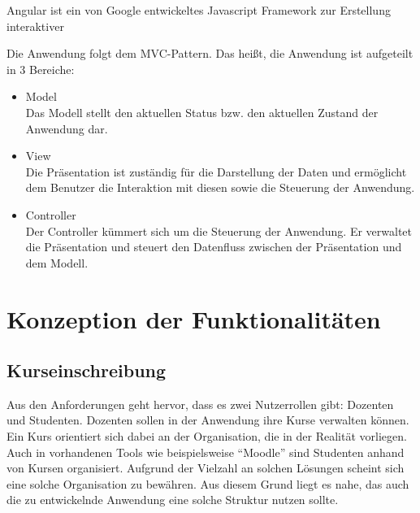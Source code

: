 Angular ist ein von Google entwickeltes Javascript Framework zur Erstellung interaktiver 



Die Anwendung folgt dem \ac{MVC}-Pattern. Das heißt, die Anwendung ist aufgeteilt in 3 Bereiche:
\begin{itemize}%
    \item Model\\
        Das Modell stellt den aktuellen Status bzw. den aktuellen Zustand der Anwendung dar.
    \item View\\
        Die Präsentation ist zuständig für die Darstellung der Daten und ermöglicht dem Benutzer die Interaktion mit diesen sowie die Steuerung der Anwendung.
    \item Controller\\
        Der Controller kümmert sich um die Steuerung der Anwendung. Er verwaltet die Präsentation und steuert den Datenfluss zwischen der Präsentation und dem Modell.
\end{itemize}


\section{Konzeption der Funktionalitäten}


\subsection{Kurseinschreibung} %
Aus den Anforderungen geht hervor, dass es zwei Nutzerrollen gibt: Dozenten und Studenten.
Dozenten sollen in der Anwendung ihre Kurse verwalten können.
Ein Kurs orientiert sich dabei an der Organisation, die in der Realität vorliegen.
Auch in vorhandenen Tools wie beispielsweise \enquote{Moodle} sind Studenten anhand von Kursen organisiert.
Aufgrund der Vielzahl an solchen Lösungen scheint sich eine solche Organisation zu bewähren.
Aus diesem Grund liegt es nahe, das auch die zu entwickelnde Anwendung eine solche Struktur nutzen sollte.


